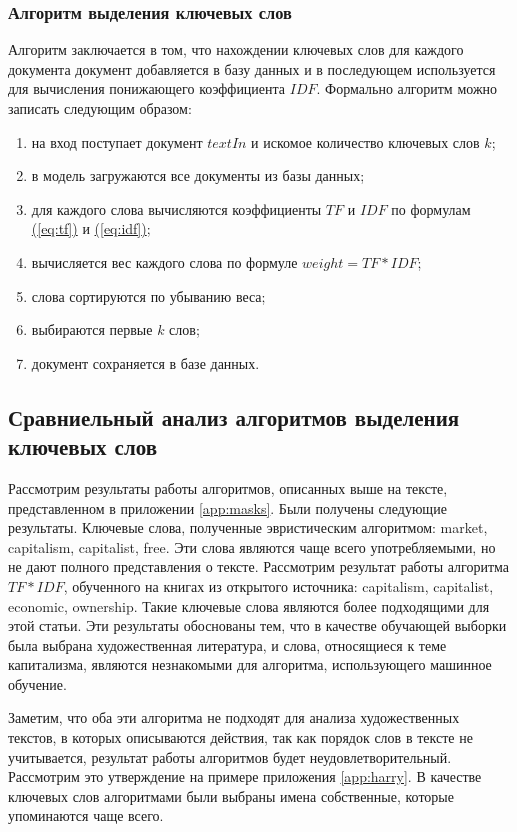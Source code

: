 \subsubsection{Алгоритм выделения ключевых слов}

Алгоритм заключается в том, что нахождении ключевых слов для каждого документа документ добавляется в базу данных и в последующем используется для вычисления понижающего коэффициента $IDF$. Формально алгоритм можно записать следующим образом:
\begin{enumerate}
\item на вход поступает документ $textIn$ и искомое количество ключевых слов $k$;
\item в модель загружаются все документы из базы данных;
\item для каждого слова вычисляются коэффициенты $TF$ и $IDF$ по формулам \hyperref[eq:tf]{(\ref{eq:tf})} и \hyperref[eq:idf]{(\ref{eq:idf})};
\item вычисляется вес каждого слова по формуле $weight = TF*IDF$;
\item слова сортируются по убыванию веса;
\item выбираются первые $k$ слов;
\item документ сохраняется в базе данных.
\end{enumerate}

\subsection{Сравниельный анализ алгоритмов выделения ключевых слов}

Рассмотрим результаты работы алгоритмов, описанных выше на тексте, представленном в приложении \hyperref[app:masks]{\ref{app:masks}}. Были получены следующие результаты. Ключевые слова, полученные эвристическим алгоритмом: market, capitalism, capitalist, free. Эти слова являются чаще всего употребляемыми, но не дают полного представления о тексте. Рассмотрим результат работы алгоритма $TF*IDF$, обученного на книгах из открытого источника: capitalism, capitalist, economic, ownership. Такие ключевые слова являются более подходящими для этой статьи. Эти результаты обоснованы тем, что в качестве обучающей выборки была выбрана художественная литература, и слова, относящиеся к теме капитализма, являются незнакомыми для алгоритма, использующего машинное обучение.

Заметим, что оба эти алгоритма не подходят для анализа художественных текстов, в которых описываются действия, так как порядок слов в тексте не учитывается, результат работы алгоритмов будет неудовлетворительный. Рассмотрим это утверждение на примере приложения \hyperref[app:harry]{\ref{app:harry}}. В качестве ключевых слов алгоритмами были выбраны имена собственные, которые упоминаются чаще всего.

